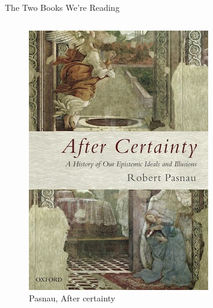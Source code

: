 \documentclass[
  17pt,
  letterpaper,
  ignorenonframetext,
  aspectratio=169,
  handout]{beamer}
\begin{document}
\begin{frame}{The Two Books We're Reading}
\protect\hypertarget{the-two-books-were-reading}{}
\begin{columns}[T]
\begin{column}{0.48\textwidth}
\begin{figure}

{\centering \includegraphics[width=\textwidth,height=0.6\textheight]{../images/pasnau_cover.jpeg}

}

\caption{Pasnau, After certainty}

\end{figure}
\end{column}

\begin{column}{0.48\textwidth}
\begin{figure}


\end{figure}
\end{column}
\end{columns}
\end{frame}
\end{document}
